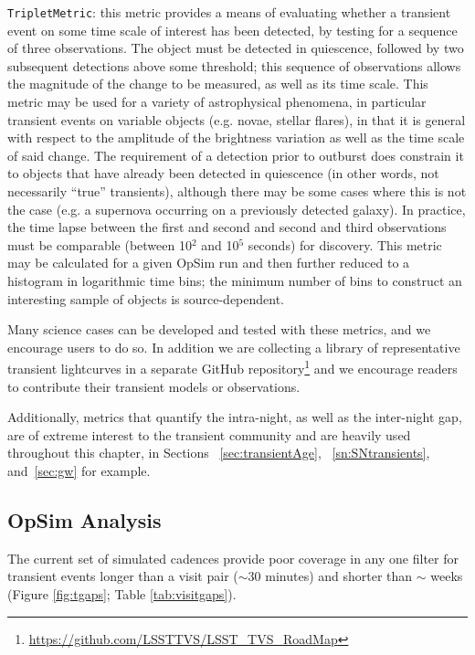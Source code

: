 \texttt{TripletMetric}: this metric provides a means of evaluating whether a transient event
on some time scale of interest has been detected, by testing for a
sequence of three observations. The object must be detected in
quiescence, followed by two subsequent detections above some
threshold; this sequence of observations allows the magnitude of the
change to be measured, as well as its time scale.
This metric may be used for a variety of astrophysical phenomena, in
particular transient events on variable objects (e.g. novae, stellar
flares), in that it is general with respect to the amplitude of the
brightness variation as well as the time scale of said change. The
requirement of a detection prior to outburst does constrain it to
objects that have already been detected in quiescence (in other words,
not necessarily ``true'' transients), although there may be some cases
where this is not the case (e.g. a supernova occurring on a previously
detected galaxy). In practice, the time lapse between the first and
second and second and third observations must be comparable (between
10$^2$ and 10$^5$ seconds) for discovery. This metric may be
calculated for a given OpSim run and then further reduced to a
histogram in logarithmic time bins; the minimum number of bins to
construct an interesting sample of objects is source-dependent.

Many science cases can be developed and tested with these metrics, and we encourage users to do so. In addition we are collecting a library of representative transient lightcurves in a separate GitHub repository\footnote{\url{https://github.com/LSSTTVS/LSST_TVS_RoadMap}} and we encourage readers to contribute their transient models or observations.

Additionally, metrics that quantify the intra-night, as well as the inter-night gap, are of extreme interest to the transient community and are heavily used throughout this chapter, in Sections ~\ref{sec:transientAge}, ~\ref{sn:SNtransients}, and~\ref{sec:gw} for example.


\subsection{OpSim Analysis}
\label{sec:\chpname:analysis}

The current set of simulated cadences 
provide poor coverage in any one
filter for transient events longer than a visit pair ($\sim$30
minutes) and shorter than $\sim$ weeks (Figure \ref{fig:tgaps}; Table
\ref{tab:visitgaps}).  

